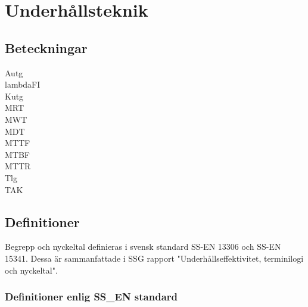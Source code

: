 \chapter{Underhållsteknik}
\section*{Beteckningar}
\acrfull{Autg}\\
\acrfull{lambdaFI}\\
\acrfull{Kutg}\\
\acrfull{MRT}\\
\acrfull{MWT}\\
\acrfull{MDT}\\
\acrfull{MTTF}\\
\acrfull{MTBF}\\
\acrfull{MTTR}\\
\acrfull{Tlg}\\
\acrfull{TAK}

	\section*{Definitioner}
	Begrepp och nyckeltal definieras i svensk standard SS-EN 13306 och SS-EN 15341. Dessa är sammanfattade i SSG rapport "Underhållseffektivitet, terminilogi och nyckeltal".
	
	\subsection*{Definitioner enlig SS\_EN standard}
	
